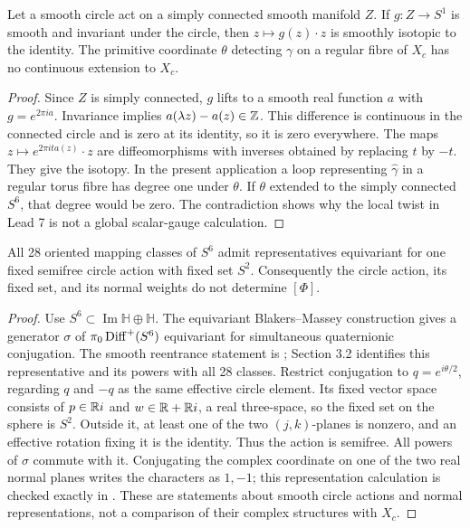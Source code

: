 \begin{proposition}
Let a smooth circle act on a simply connected smooth manifold $Z$.
If $g:Z\to S^1$ is smooth and invariant under the circle, then
$z\mapsto g(z)\cdot z$ is smoothly isotopic to the identity.
The primitive coordinate $\theta$ detecting $\gamma$ on a regular
fibre of $X_c$ has no continuous extension to $X_c$.
\end{proposition}

\begin{proof}
Since $Z$ is simply connected, $g$ lifts to a smooth real function
$a$ with $g=e^{2\pi ia}$. Invariance implies
$a(\lambda z)-a(z)\in\mathbb Z$. This difference is continuous in the
connected circle and is zero at its identity, so it is zero
everywhere. The maps $z\mapsto e^{2\pi ita(z)}\cdot z$ are
diffeomorphisms with inverses obtained by replacing $t$ by $-t$.
They give the isotopy. In the present application a loop representing
$\widehat\gamma$ in a regular torus fibre has degree one under
$\theta$. If $\theta$ extended to the simply connected $S^6$,
that degree would be zero. The contradiction shows why the local
twist in Lead 7 is not a global scalar-gauge calculation.
\end{proof}

\begin{proposition}
All 28 oriented mapping classes of $S^6$ admit representatives
equivariant for one fixed semifree circle action with fixed set $S^2$.
Consequently the circle action, its fixed set, and its normal weights
do not determine $[\Phi]$.
\end{proposition}

\begin{proof}
Use $S^6\subset\operatorname{Im}\mathbb H\oplus\mathbb H$.
The equivariant Blakers--Massey construction gives a generator
$\sigma$ of $\pi_0\operatorname{Diff}^+(S^6)$ equivariant for simultaneous
quaternionic conjugation. The smooth reentrance statement is
\citet[Theorem 2.1]{DuranRigas2007}; Section 3.2 identifies this
representative and its powers with all 28 classes. Restrict
conjugation to $q=e^{i\theta/2}$, regarding $q$ and $-q$ as the
same effective circle element. Its fixed vector space consists of
$p\in\mathbb R i$ and $w\in\mathbb R+\mathbb R i$, a real three-space, so the
fixed set on the sphere is $S^2$. Outside it, at least one of the
two $(j,k)$-planes is nonzero, and an effective rotation fixing it
is the identity. Thus the action is semifree. All powers of
$\sigma$ commute with it. Conjugating the complex coordinate on
one of the two real normal planes writes the characters as
$1,-1$; this representation calculation is checked exactly in
. These are statements about smooth circle
actions and normal representations, not a comparison of their
complex structures with $X_c$.
\end{proof}

